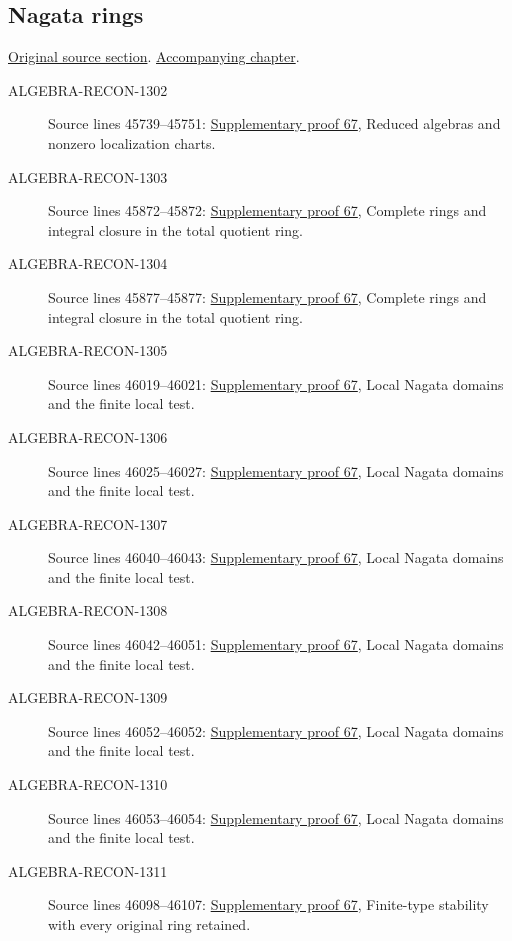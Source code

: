 \subsection{Nagata rings}
\hypertarget{algebra-source-section-nagata}{}
\noindent\href{https://github.com/stacks/stacks-project/blob/a04446e57ec1fbc252a871afcec7752fb2807b14/algebra.tex\#L45615}{Original source section}. \href{algebra.pdf\#nameddest=section-nagata}{Accompanying chapter}.

\begin{description}
\item[ALGEBRA-RECON-1302] Source lines 45739--45751: \hyperlink{algebra_nagata_notes_20260929}{Supplementary proof 67}, Reduced algebras and nonzero localization charts.
\item[ALGEBRA-RECON-1303] Source lines 45872--45872: \hyperlink{algebra_nagata_notes_20260929}{Supplementary proof 67}, Complete rings and integral closure in the total quotient ring.
\item[ALGEBRA-RECON-1304] Source lines 45877--45877: \hyperlink{algebra_nagata_notes_20260929}{Supplementary proof 67}, Complete rings and integral closure in the total quotient ring.
\item[ALGEBRA-RECON-1305] Source lines 46019--46021: \hyperlink{algebra_nagata_notes_20260929}{Supplementary proof 67}, Local Nagata domains and the finite local test.
\item[ALGEBRA-RECON-1306] Source lines 46025--46027: \hyperlink{algebra_nagata_notes_20260929}{Supplementary proof 67}, Local Nagata domains and the finite local test.
\item[ALGEBRA-RECON-1307] Source lines 46040--46043: \hyperlink{algebra_nagata_notes_20260929}{Supplementary proof 67}, Local Nagata domains and the finite local test.
\item[ALGEBRA-RECON-1308] Source lines 46042--46051: \hyperlink{algebra_nagata_notes_20260929}{Supplementary proof 67}, Local Nagata domains and the finite local test.
\item[ALGEBRA-RECON-1309] Source lines 46052--46052: \hyperlink{algebra_nagata_notes_20260929}{Supplementary proof 67}, Local Nagata domains and the finite local test.
\item[ALGEBRA-RECON-1310] Source lines 46053--46054: \hyperlink{algebra_nagata_notes_20260929}{Supplementary proof 67}, Local Nagata domains and the finite local test.
\item[ALGEBRA-RECON-1311] Source lines 46098--46107: \hyperlink{algebra_nagata_notes_20260929}{Supplementary proof 67}, Finite-type stability with every original ring retained.

\end{description}
